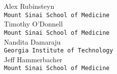 Alex Rubinsteyn \\
  \texttt{Mount Sinai School of Medicine} \\

  Timothy O'Donnell \\
  \texttt{Mount Sinai School of Medicine} \\

  Nandita Damaraju \\
  \texttt{Georgia Institute of Technology} \\

  Jeff Hammerbacher \\
  \texttt{Mount Sinai School of Medicine} \\